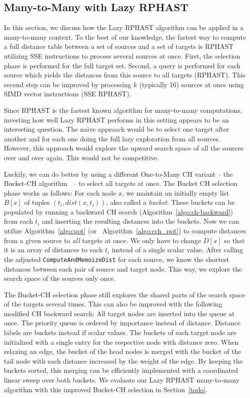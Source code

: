 \documentclass[a4paper,UKenglish,cleveref, autoref, thm-restate]{lipics-v2021}
\begin{document}
\subsection{Many-to-Many with Lazy RPHAST}

In this section, we discuss how the Lazy RPHAST algorithm can be applied in a many-to-many context.
To the best of our knowledge, the fastest way to compute a full distance table between a set of sources and a set of targets is RPHAST utilizing SSE instructions to process several sources at once.
First, the selection phase is performed for the full target set.
Second, a query is performed for each source which yields the distances from this source to all targets (RPHAST).
This second step can be improved by processing $k$ (typically 16) sources at once using SIMD vector instructions (SSE RPHAST).

Since RPHAST is the fastest known algorithm for many-to-many computations, investing how well Lazy RPHAST performs in this setting appears to be an interesting question.
The naive approach would be to select one target after another and for each one doing the full lazy exploration from all sources.
However, this approach would explore the upward search space of all the sources over and over again.
This would not be competitive.

Luckily, we can do better by using a different One-to-Many CH variant -- the Bucket-CH algorithm~\cite{gssv-erlrn-12} -- to select all targets at once.
The Bucket CH selection phase works as follows:
For each node $x$, we maintain an initially empty list $B[x]$ of tuples $(t_i, dist(x,t_i))$, also called a \emph{bucket}.
These buckets can be populated by running a backward CH search (Algorithm~\ref{algo:ch-backward}) from each $t_i$ and inserting the resulting distances into the buckets.
Now we can utilize Algorithm~\ref{algo:pot} (or~ Algorithm~\ref{algo:cch_pot}) to compute distances from a given source to \emph{all} targets at once.
We only have to change $D[x]$ so that it is an array of distances to each $t_i$ instead of a single scalar value.
After calling the adjusted \texttt{ComputeAndMemoizeDist} for each source, we know the shortest distances between each pair of source and target node.
This way, we explore the search space of the sources only once.

The Bucket-CH selection phase still explores the shared parts of the search space of the targets several times.
This can also be improved with the following modified CH backward search:
All target nodes are inserted into the queue at once.
The priority queue is ordered by importance instead of distance.
Distance labels are buckets instead if scalar values.
The buckets of each target node are initialized with a single entry for the respective node with distance zero.
When relaxing an edge, the bucket of the head nodes is merged with the bucket of the tail node with each distance increased by the weight of the edge.
By keeping the buckets sorted, this merging can be efficiently implemented with a coordinated linear sweep over both buckets.
We evaluate our Lazy RPHAST many-to-many algorithm with this improved Bucket-CH selection in Section~\ref{todo}.
\end{document}

